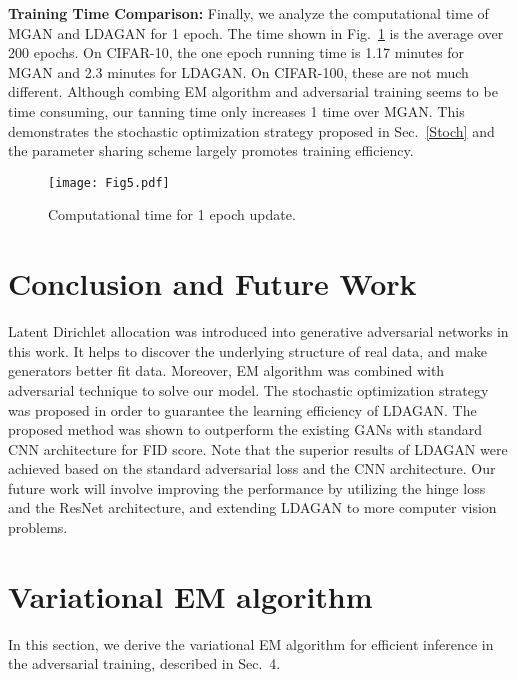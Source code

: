 \documentclass{article}
\begin{document}
\noindent\textbf{Training Time Comparison:}
Finally, we analyze the computational time of MGAN and LDAGAN for 1 epoch.
The time shown in Fig.~\ref{fig:Time} is the average over 200 epochs.
On CIFAR-10, the one epoch running time is 1.17 minutes for MGAN and 2.3 minutes for LDAGAN.
On CIFAR-100, these are not much different.
Although combing EM algorithm and adversarial training seems to be time consuming, our tanning time only increases 1 time over MGAN.
This demonstrates the stochastic optimization strategy proposed in Sec.~\ref{Stoch} and the parameter sharing scheme largely promotes training efficiency.

\begin{figure}[h]
  \centering
    \texttt{[image: Fig5.pdf]}
     \caption{Computational time for 1 epoch update.}
     \label{fig:Time}
\end{figure}




\section{Conclusion and Future Work}
\label{sec:Conclusion}
Latent Dirichlet allocation was introduced into generative adversarial networks in this work.
It helps to discover the underlying structure of real data, and make generators better fit data.
Moreover, EM algorithm was combined with adversarial technique to solve our model.
The stochastic optimization strategy was proposed in order to guarantee the learning efficiency of LDAGAN.
The proposed method was shown to outperform the existing GANs with standard CNN architecture for FID score.
Note that the superior results of LDAGAN were achieved based on the standard adversarial loss and the CNN architecture.
Our future work will involve improving the performance by utilizing the hinge loss and the ResNet architecture, and extending LDAGAN to more computer vision problems.






\onecolumn
\appendix
\section{Variational EM algorithm}
\label{Appendix}

In this section, we derive the variational EM algorithm for efficient inference in the adversarial training,  described in Sec.~4.
\end{document}
